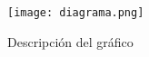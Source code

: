 \documentclass{article}
\begin{document}
\begin{figure}
    \centering
    \texttt{[image: diagrama.png]}
    \caption{Descripción del gráfico}
\end{figure}
\end{document}
